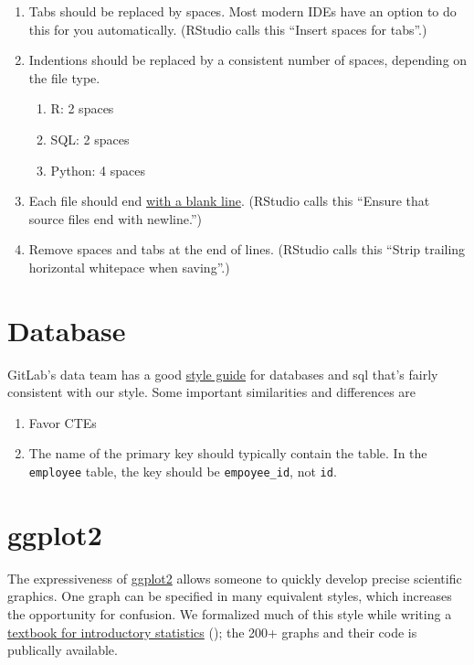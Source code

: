 \documentclass[
]{book}
\providecommand{\tightlist}{%
  \setlength{\itemsep}{0pt}\setlength{\parskip}{0pt}}
\begin{document}
\begin{enumerate}
\def\labelenumi{\arabic{enumi}.}
\tightlist
\item
  Tabs should be replaced by spaces. Most modern IDEs have an option to do this for you automatically. (RStudio calls this ``Insert spaces for tabs''.)
\item
  Indentions should be replaced by a consistent number of spaces, depending on the file type.

  \begin{enumerate}
  \def\labelenumii{\arabic{enumii}.}
  \tightlist
  \item
    R: 2 spaces
  \item
    SQL: 2 spaces
  \item
    Python: 4 spaces
  \end{enumerate}
\item
  Each file should end \href{https://unix.stackexchange.com/a/18746/104659}{with a blank line}. (RStudio calls this ``Ensure that source files end with newline.'')
\item
  Remove spaces and tabs at the end of lines. (RStudio calls this ``Strip trailing horizontal whitepace when saving''.)
\end{enumerate}

\hypertarget{style-database}{%
\section{Database}\label{style-database}}

GitLab's data team has a good \href{https://about.gitlab.com/handbook/business-ops/data-team/sql-style-guide/}{style guide} for databases and sql that's fairly consistent with our style. Some important similarities and differences are

\begin{enumerate}
\def\labelenumi{\arabic{enumi}.}
\item
  Favor CTEs
\item
  The name of the primary key should typically contain the table. In the \texttt{employee} table, the key should be \texttt{empoyee\_id}, not \texttt{id}.
\end{enumerate}

\hypertarget{style-ggplot}{%
\section{ggplot2}\label{style-ggplot}}

The expressiveness of \href{https://ggplot2.tidyverse.org/}{ggplot2} allows someone to quickly develop precise scientific graphics. One graph can be specified in many equivalent styles, which increases the opportunity for confusion. We formalized much of this style while writing a \href{https://github.com/OuhscBbmc/DeSheaToothakerIntroStats/blob/master/thumbnails/thumbnails.md}{textbook for introductory statistics} (\citet{deshea}); the 200+ graphs and their code is publically available.
\end{document}
